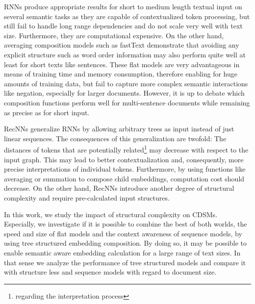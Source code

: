 \acp{RNN} produce appropriate results for short to medium length textual input on several semantic tasks  \autocite{vinyals_show_2014,wu_googles_2016,xiong_microsoft_2017} as they are capable of contextualized token processing, but still fail to handle long range dependencies and do not scale  very well with text size. Furthermore, they are computational expensive. On the other hand, averaging composition models such as fastText \autocite{joulin_bag_2017} demonstrate that avoiding any explicit structure such as word order information  may also perform quite well at least for short texts like sentences. These flat models are very advantageous in means of training time and memory consumption, therefore enabling for huge amounts of training data, but fail to capture more complex semantic interactions like negation, especially for larger documents. However, it is up to debate which composition functions perform well for multi-sentence documents while remaining as precise as for short input.%

\acp{RecNN} \autocite{goller_learning_1996,socher_parsing_2011} generalize \acp{RNN} by allowing arbitrary trees as input instead of just linear sequences. The consequences of this generalization are twofold: The distances of tokens that are potentially related\footnote{regarding the interpretation process} may decrease with respect to the input graph. This may lead to better  contextualization and, consequently, more precise interpretations of individual tokens. Furthermore, by using functions like averaging or summation to compose child embeddings, computation cost should decrease. On the other hand, \acp{RecNN} introduce another degree of structural complexity and require pre-calculated input structures.%

In this work, we study the impact of structural complexity on \acp{CDSM}. Especially, we investigate if it is possible to combine the best of both worlds, the speed and size of flat models and the context awareness of sequence models, by using tree structured embedding composition. By doing so, it may be possible to enable semantic aware embedding calculation for a large range of text sizes. In that sense we analyze the performance of tree structured models and compare it with structure less and sequence models with regard to document size.



